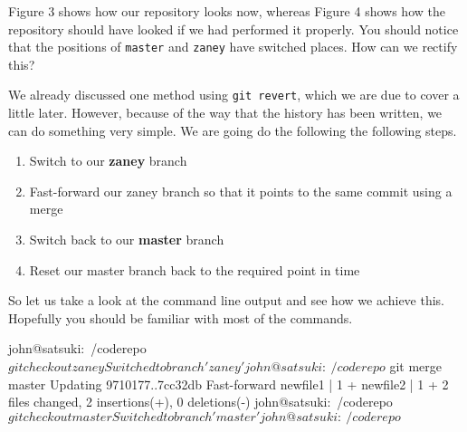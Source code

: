 


Figure 3 shows how our repository looks now, whereas Figure 4 shows how the repository should have looked if we had performed it properly.
You should notice that the positions of \texttt{master} and \texttt{zaney} have switched places.
How can we rectify this?

We already discussed one method using \texttt{git revert}, which we are due to cover a little later.
However, because of the way that the history has been written, we can do something very simple.
We are going do the following the following steps.

\begin{enumerate}
\item Switch to our \textbf{zaney} branch
\item Fast-forward our zaney branch so that it points to the same commit using a merge
\item Switch back to our \textbf{master} branch
\item Reset our master branch back to the required point in time
\end{enumerate}

So let us take a look at the command line output and see how we achieve this.
Hopefully you should be familiar with most of the commands.

\begin{code}
john@satsuki:~/coderepo$ git checkout zaney
Switched to branch 'zaney'
john@satsuki:~/coderepo$ git merge master
Updating 9710177..7cc32db
Fast-forward
 newfile1 |    1 +
 newfile2 |    1 +
 2 files changed, 2 insertions(+), 0 deletions(-)
john@satsuki:~/coderepo$ git checkout master
Switched to branch 'master'
john@satsuki:~/coderepo$
\end{code}


